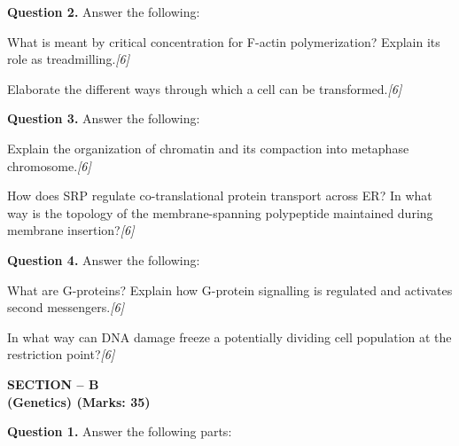 \documentclass[11pt,a4paper]{article}
\newcommand{\pts}[1]{\hfill   \textit{[#1]}}
\begin{document}
\medskip


\noindent   \textbf{Question 2.} Answer the following:

\begin{parts}
  \item What is meant by critical concentration for F-actin polymerization? Explain its role as treadmilling.\pts{6}
  \item Elaborate the different ways through which a cell can be transformed.\pts{6}
\end{parts}

\medskip


\noindent   \textbf{Question 3.} Answer the following:

\begin{parts}
  \item Explain the organization of chromatin and its compaction into metaphase chromosome.\pts{6}
  \item How does SRP regulate co-translational protein transport across ER? In what way is the topology of the membrane-spanning polypeptide maintained during membrane insertion?\pts{6}
\end{parts}

\pagebreak

\medskip


\noindent   \textbf{Question 4.} Answer the following:

\begin{parts}
  \item What are G-proteins? Explain how G-protein signalling is regulated and activates second messengers.\pts{6}
  \item In what way can DNA damage freeze a potentially dividing cell population at the restriction point?\pts{6}
\end{parts}

\bigskip

\begin{center}
   \textbf{SECTION -- B} \\
   \textbf{(Genetics) (Marks: 35)}
\end{center}




\noindent   \textbf{Question 1.} Answer the following parts:
\end{document}
